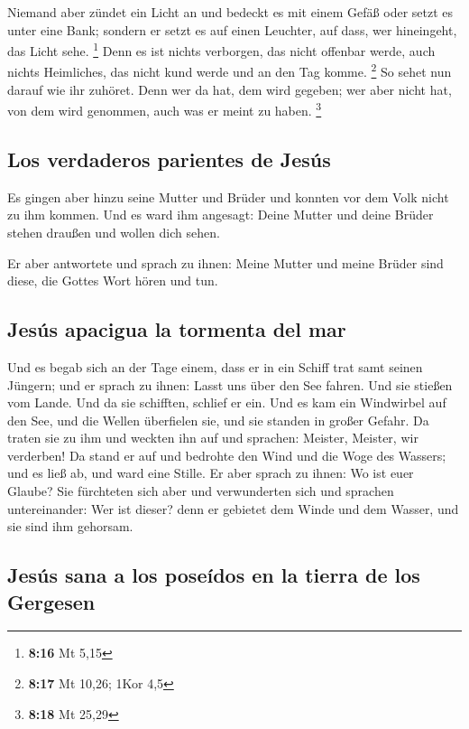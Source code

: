  Niemand aber zündet ein Licht an und bedeckt es mit
einem Gefäß oder setzt es unter eine Bank; sondern er setzt es auf einen
Leuchter, auf dass, wer hineingeht, das Licht sehe. \footnote{\textbf{8:16}
  Mt 5,15}  Denn es ist nichts verborgen, das nicht
offenbar werde, auch nichts Heimliches, das nicht kund werde und an den
Tag komme. \footnote{\textbf{8:17} Mt 10,26; 1Kor 4,5} 
So sehet nun darauf wie ihr zuhöret. Denn wer da hat, dem wird gegeben;
wer aber nicht hat, von dem wird genommen, auch was er meint zu haben.
\footnote{\textbf{8:18} Mt 25,29}

\hypertarget{los-verdaderos-parientes-de-jesuxfas}{%
\subsection{Los verdaderos parientes de
Jesús}\label{los-verdaderos-parientes-de-jesuxfas}}

 Es gingen aber hinzu seine Mutter und Brüder und konnten
vor dem Volk nicht zu ihm kommen.  Und es ward ihm
angesagt: Deine Mutter und deine Brüder stehen draußen und wollen dich
sehen.

 Er aber antwortete und sprach zu ihnen: Meine Mutter und
meine Brüder sind diese, die Gottes Wort hören und tun.

\hypertarget{jesuxfas-apacigua-la-tormenta-del-mar}{%
\subsection{Jesús apacigua la tormenta del
mar}\label{jesuxfas-apacigua-la-tormenta-del-mar}}

 Und es begab sich an der Tage einem, dass er in ein
Schiff trat samt seinen Jüngern; und er sprach zu ihnen: Lasst uns über
den See fahren. Und sie stießen vom Lande.  Und da sie
schifften, schlief er ein. Und es kam ein Windwirbel auf den See, und
die Wellen überfielen sie, und sie standen in großer Gefahr.
 Da traten sie zu ihm und weckten ihn auf und sprachen:
Meister, Meister, wir verderben! Da stand er auf und bedrohte den Wind
und die Woge des Wassers; und es ließ ab, und ward eine Stille.
 Er aber sprach zu ihnen: Wo ist euer Glaube? Sie
fürchteten sich aber und verwunderten sich und sprachen untereinander:
Wer ist dieser? denn er gebietet dem Winde und dem Wasser, und sie sind
ihm gehorsam.

\hypertarget{jesuxfas-sana-a-los-poseuxeddos-en-la-tierra-de-los-gergesen}{%
\subsection{Jesús sana a los poseídos en la tierra de los
Gergesen}\label{jesuxfas-sana-a-los-poseuxeddos-en-la-tierra-de-los-gergesen}}

